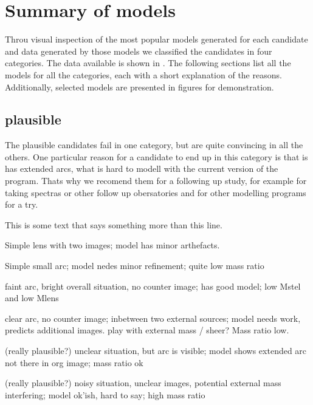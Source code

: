 \section{Summary of models}

Throu visual inspection of the most popular models generated for each candidate and data generated by those models we classified the candidates in four categories.
The data available is shown in .
The following sections list all the models for all the categories, each with a short explanation of the reasons.
Additionally, selected models are presented in figures for demonstration.

\subsection{plausible}

The plausible candidates fail in one category, but are quite convincing in all the others.
One particular reason for a candidate to end up in this category is that is has extended arcs, what is hard to modell with the current version of the program.
Thats why we recomend them for a following up study, for example for taking spectras or other follow up obersatories and for other modelling programs for a try.


  This is some text that says something more than this line.

  Simple lens with two images;
  model has minor arthefacts.

  Simple small arc;
  model nedes minor refinement;
  quite low mass ratio
  
  faint arc, bright overall situation, no counter image;
  has good model;
  low Mstel and low Mlens
  
  clear arc, no counter image; inbetween two external sources;
  model needs work, predicts additional images. play with external mass / sheer?
  Mass ratio low.
  
  (really plausible?)
  unclear situation, but arc is visible;
  model shows extended arc not there in org image;
  mass ratio ok
  
  (really plausible?)
  noisy situation, unclear images, potential external mass interfering;
  model ok'ish, hard to say;
  high mass ratio
  
